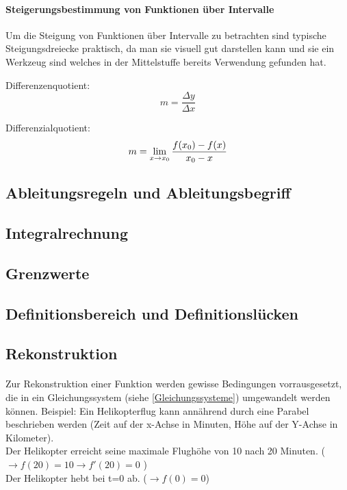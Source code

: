 \documentclass{article}
\begin{document}
\paragraph{Steigerungsbestimmung von Funktionen über Intervalle}

Um die Steigung von Funktionen über Intervalle zu betrachten sind typische Steigungsdreiecke praktisch,
da man sie visuell gut darstellen kann und sie ein Werkzeug sind welches in der Mittelstuffe bereits
Verwendung gefunden hat.

Differenzenquotient:
\[
    m = {\frac {\Delta y} {\Delta x}}
\]

Differenzialquotient:
\[
    m = \lim_{x \to x_{0}} {{f(x_{0}) - f(x)} \over { x_{0} - x}}
\]



\paragraph{}

\subsection{Ableitungsregeln und Ableitungsbegriff}\label{Ableitungen}
\subsection{Integralrechnung}\label{Integralrechnung}

\subsection{Grenzwerte}
\subsection{Definitionsbereich und Definitionslücken}\label{Definitionsbereich}
\subsection{Rekonstruktion}\label{Rekonstruktion}
\paragraph{}
Zur Rekonstruktion einer Funktion werden gewisse Bedingungen vorrausgesetzt, die in ein Gleichungssystem (siehe \ref{Gleichungssysteme}) umgewandelt werden können.
Beispiel: Ein Helikopterflug kann annährend durch eine Parabel beschrieben werden (Zeit auf der x-Achse in Minuten, Höhe auf der Y-Achse in Kilometer). \\
Der Helikopter erreicht seine maximale Flughöhe von 10 nach 20 Minuten. ( $ \rightarrow f(20)=10 \rightarrow f'(20)=0 $ ) \\
Der Helikopter hebt bei t=0 ab. ($ \rightarrow f(0)=0$) \\
\end{document}
